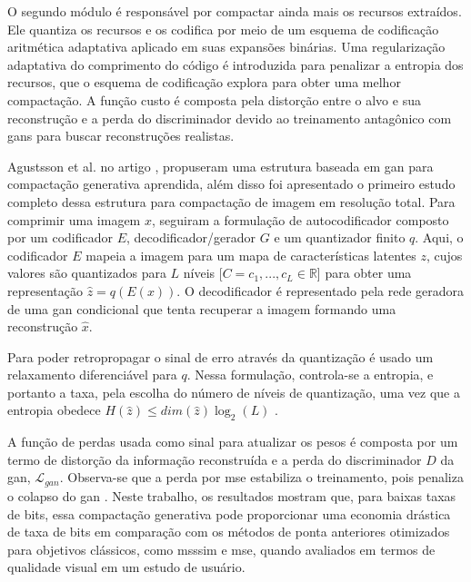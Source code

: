 O segundo módulo é responsável por compactar ainda mais os recursos extraídos. Ele quantiza os recursos e os codifica por meio de um esquema de codificação aritmética adaptativa aplicado em suas expansões binárias. Uma regularização adaptativa do comprimento do código é introduzida para penalizar a entropia dos recursos, que o esquema de codificação explora para obter uma melhor compactação. 
A função custo é composta pela distorção entre o alvo e sua reconstrução e a perda do discriminador devido ao treinamento antagônico com \acrshort{gan}s para buscar reconstruções realistas.

Agustsson et al. no artigo \cite{agustsson2019generative}, propuseram uma estrutura baseada em \acrshort{gan} para compactação generativa aprendida, além disso foi apresentado o primeiro estudo completo dessa estrutura para compactação de imagem em resolução total. 
Para comprimir uma imagem $x$, seguiram a formulação de autocodificador composto por um codificador $E$, decodificador/gerador $G$  e um quantizador finito $q$. 
Aqui, o codificador $E$ mapeia a imagem para um mapa de características latentes $z$, cujos valores são quantizados para $L$ níveis [$C = {c_1,. . . , c_L}  \in \mathbb{R}$]  para obter uma representação $\hat{z} = q(E(x))$.
O decodificador é representado pela rede geradora de uma \acrshort{gan} condicional \cite{mirza2014conditional}  que tenta recuperar a imagem formando uma reconstrução $\hat{x}$.

Para poder retropropagar o sinal de erro através da quantização é usado um relaxamento diferenciável para $q$. Nessa formulação, controla-se a entropia, e portanto a taxa, pela escolha do número de níveis de quantização, uma vez que a entropia obedece  $H(\hat{z}) \leq dim(\hat{z}) \log_2(L)$  \cite{agustsson2019generative}. 

A função de perdas usada como sinal para atualizar os pesos é composta por um termo de distorção da informação reconstruída e a perda do discriminador $D$ da \acrshort{gan}, $\mathcal{L}_{gan}$. Observa-se que a perda por \acrshort{mse} estabiliza o treinamento, pois penaliza o colapso do \acrshort{gan} \cite{agustsson2019generative}.
Neste trabalho, os resultados mostram que, para baixas taxas de bits, essa compactação generativa pode proporcionar uma economia drástica de taxa de bits em comparação com os métodos de ponta anteriores otimizados para objetivos clássicos, como \acrshort{msssim} e \acrshort{mse}, quando avaliados em termos de qualidade visual em um estudo de usuário. 

